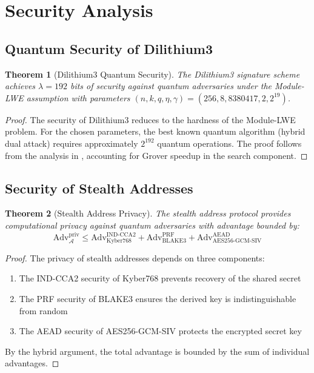 \documentclass[12pt,a4paper]{article}
\newtheorem{theorem}{Theorem}
\begin{document}
\section{Security Analysis}

\subsection{Quantum Security of Dilithium3}

\begin{theorem}[Dilithium3 Quantum Security]
The Dilithium3 signature scheme achieves $\lambda = 192$ bits of security against quantum adversaries under the Module-LWE assumption with parameters $(n, k, q, \eta, \gamma) = (256, 8, 8380417, 2, 2^{19})$.
\end{theorem}

\begin{proof}
The security of Dilithium3 reduces to the hardness of the Module-LWE problem. For the chosen parameters, the best known quantum algorithm (hybrid dual attack) requires approximately $2^{192}$ quantum operations. The proof follows from the analysis in \cite{ducas2018}, accounting for Grover speedup in the search component.
\end{proof}

\subsection{Security of Stealth Addresses}

\begin{theorem}[Stealth Address Privacy]
The stealth address protocol provides computational privacy against quantum adversaries with advantage bounded by:
$$\text{Adv}^{\text{priv}}_{\mathcal{A}} \leq \text{Adv}^{\text{IND-CCA2}}_{\text{Kyber768}} + \text{Adv}^{\text{PRF}}_{\text{BLAKE3}} + \text{Adv}^{\text{AEAD}}_{\text{AES256-GCM-SIV}}$$
\end{theorem}

\begin{proof}
The privacy of stealth addresses depends on three components:
\begin{enumerate}
\item The IND-CCA2 security of Kyber768 prevents recovery of the shared secret
\item The PRF security of BLAKE3 ensures the derived key is indistinguishable from random
\item The AEAD security of AES256-GCM-SIV protects the encrypted secret key
\end{enumerate}
By the hybrid argument, the total advantage is bounded by the sum of individual advantages.
\end{proof}
\end{document}
